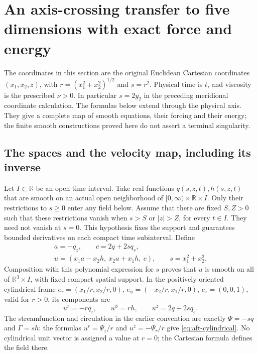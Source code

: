 \section{An axis-crossing transfer to five dimensions with exact force and energy}
\label{sec:axis-five-dimensional-transfer}

The coordinates in this section are the original Euclidean Cartesian
coordinates \((x_1,x_2,z)\), with \(r=(x_1^2+x_2^2)^{1/2}\) and
\(s=r^2\).  Physical time is \(t\), and viscosity is the prescribed
\(\nu>0\).  In particular \(s=2y_2\) in the preceding meridional
coordinate calculation.  The formulas below extend through the physical
axis.  They give a complete map of smooth equations, their forcing and
their energy; the finite smooth constructions proved here do not assert
a terminal singularity.

\subsection{The spaces and the velocity map, including its inverse}

Let \(I\subset\mathbb R\) be an open time interval.  Take real functions
\(q(s,z,t),h(s,z,t)\) that are smooth on an actual open neighborhood
of \([0,\infty)\times\mathbb R\times I\).  Only their restrictions to
\(s\geq0\) enter any field below.  Assume that there are fixed
\(S,Z>0\) such that these restrictions vanish when \(s>S\) or
\(|z|>Z\), for every \(t\in I\).  They need not vanish at \(s=0\).
This hypothesis fixes the support and guarantees bounded derivatives on
each compact time subinterval.  Define
\begin{equation}\label{eq:aft-velocity}
 \begin{gathered}
 a=-q_z,\qquad c=2q+2s q_s,\\
 u=(x_1a-x_2h,\ x_2a+x_1h,\ c),\qquad s=x_1^2+x_2^2.
 \end{gathered}
\end{equation}
Composition with this polynomial expression for \(s\) proves that \(u\)
is smooth on all of \(\mathbb R^3\times I\), with fixed compact spatial
support.  In the positively oriented cylindrical frame
\(e_r=(x_1/r,x_2/r,0)\), \(e_\phi=(-x_2/r,x_1/r,0)\), \(e_z=(0,0,1)\),
valid for \(r>0\), its components are
\begin{equation}\label{eq:aft-cylindrical}
 u^r=-rq_z,\qquad u^\phi=rh,\qquad u^z=2q+2s q_s.
\end{equation}
The streamfunction and circulation in the earlier convention are exactly
\(\Psi=-s q\) and \(\Gamma=s h\): the formulas
\(u^r=\Psi_z/r\) and \(u^z=-\Psi_r/r\) give
\eqref{eq:aft-cylindrical}.  No cylindrical unit vector is assigned a
value at \(r=0\); the Cartesian formula defines the field there.

